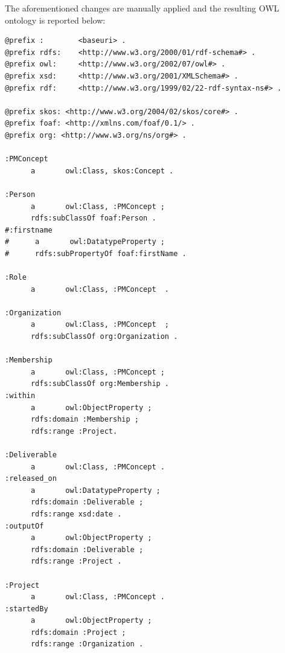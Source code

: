 \documentclass[11pt]{llncs}
\begin{document}
The aforementioned changes are manually applied and the resulting OWL ontology is reported below:
\begin{lstlisting}
@prefix :        <baseuri> .
@prefix rdfs:    <http://www.w3.org/2000/01/rdf-schema#> .
@prefix owl:     <http://www.w3.org/2002/07/owl#> .
@prefix xsd:     <http://www.w3.org/2001/XMLSchema#> .
@prefix rdf:     <http://www.w3.org/1999/02/22-rdf-syntax-ns#> .

@prefix skos: <http://www.w3.org/2004/02/skos/core#> .
@prefix foaf: <http://xmlns.com/foaf/0.1/> .
@prefix org: <http://www.w3.org/ns/org#> .

:PMConcept
      a       owl:Class, skos:Concept .

:Person
      a       owl:Class, :PMConcept ;
      rdfs:subClassOf foaf:Person .
#:firstname
#      a       owl:DatatypeProperty ;
#      rdfs:subPropertyOf foaf:firstName .

:Role
      a       owl:Class, :PMConcept  .

:Organization
      a       owl:Class, :PMConcept  ;
      rdfs:subClassOf org:Organization .

:Membership
      a       owl:Class, :PMConcept ;
      rdfs:subClassOf org:Membership .
:within
      a       owl:ObjectProperty ;
      rdfs:domain :Membership ;
      rdfs:range :Project.

:Deliverable
      a       owl:Class, :PMConcept .
:released_on
      a       owl:DatatypeProperty ;
      rdfs:domain :Deliverable ;
      rdfs:range xsd:date .
:outputOf
      a       owl:ObjectProperty ;
      rdfs:domain :Deliverable ;
      rdfs:range :Project .

:Project
      a       owl:Class, :PMConcept .
:startedBy
      a       owl:ObjectProperty ;
      rdfs:domain :Project ;
      rdfs:range :Organization .
\end{lstlisting}




  
%
  
\end{document}
